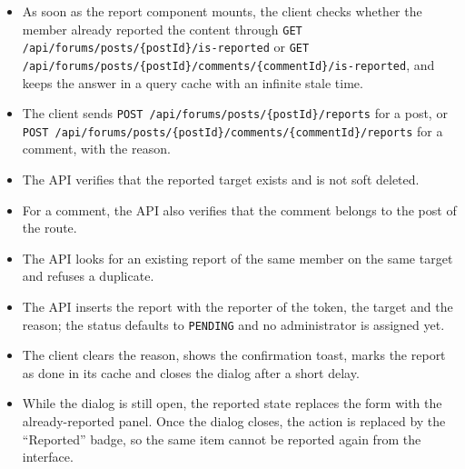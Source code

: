 \begin{itemize}[leftmargin=1.6em,topsep=3pt,itemsep=2pt,parsep=0pt,label=$\bullet$]
      \item As soon as the report component mounts, the client checks whether the member
            already reported the content through \texttt{GET
                  /api/forums/posts/\{postId\}/is-reported} or \texttt{GET
                  /api/forums/posts/\{postId\}/comments/\{commentId\}/is-reported}, and keeps the
            answer in a query cache with an infinite stale time.
      \item The client sends \texttt{POST /api/forums/posts/\{postId\}/reports} for a post,
            or \texttt{POST /api/forums/posts/\{postId\}/comments/\{commentId\}/reports}
            for a comment, with the reason.
      \item The API verifies that the reported target exists and is not soft deleted.
      \item For a comment, the API also verifies that the comment belongs to the post of
            the route.
      \item The API looks for an existing report of the same member on the same target and
            refuses a duplicate.
      \item The API inserts the report with the reporter of the token, the target and the
            reason; the status defaults to \texttt{PENDING} and no administrator is
            assigned yet.
      \item The client clears the reason, shows the confirmation toast, marks the report as
            done in its cache and closes the dialog after a short delay.
      \item While the dialog is still open, the reported state replaces the form with the
            already-reported panel. Once the dialog closes, the action is replaced by the
            ``Reported'' badge, so the same item cannot be reported again from the
            interface.
\end{itemize}

